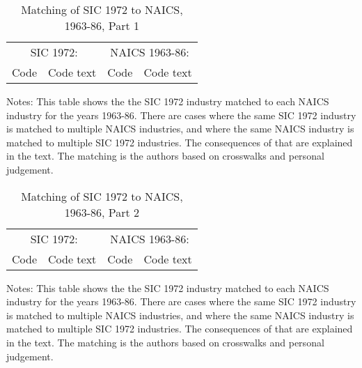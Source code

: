 \documentclass[11pt]{article}
\begin{document}
\begin{table}[!htb]
\begin{center}
\label{TAB_match3}
\caption{Matching of SIC 1972 to NAICS, 1963-86, Part 1}
{\footnotesize
\begin{tabular}{llll}
\midrule
\multicolumn{2}{c}{SIC 1972:} & \multicolumn{2}{c}{NAICS 1963-86:} \\ \cmidrule(lr){1-2} \cmidrule(lr){3-4}
Code  & Code text  & Code & Code text \\ 
\midrule

\midrule
\end{tabular}
}
\end{center}
{\footnotesize Notes: This table shows the the SIC 1972 industry matched to each NAICS industry for the years 1963-86. There are cases where the same SIC 1972 industry is matched to multiple NAICS industries, and where the same NAICS industry is matched to multiple SIC 1972 industries. The consequences of that are explained in the text. The matching is the authors based on crosswalks and personal judgement.}
\end{table}


\begin{table}[!htb]
\begin{center}
\label{TAB_match4}
\caption{Matching of SIC 1972 to NAICS, 1963-86, Part 2}
{\footnotesize
\begin{tabular}{llll}
\midrule
\multicolumn{2}{c}{SIC 1972:} & \multicolumn{2}{c}{NAICS 1963-86:} \\ \cmidrule(lr){1-2} \cmidrule(lr){3-4}
Code  & Code text  & Code & Code text \\ 
\midrule

\midrule
\end{tabular}
}
\end{center}
{\footnotesize Notes: This table shows the the SIC 1972 industry matched to each NAICS industry for the years 1963-86. There are cases where the same SIC 1972 industry is matched to multiple NAICS industries, and where the same NAICS industry is matched to multiple SIC 1972 industries. The consequences of that are explained in the text. The matching is the authors based on crosswalks and personal judgement.}
\end{table}
\end{document}
